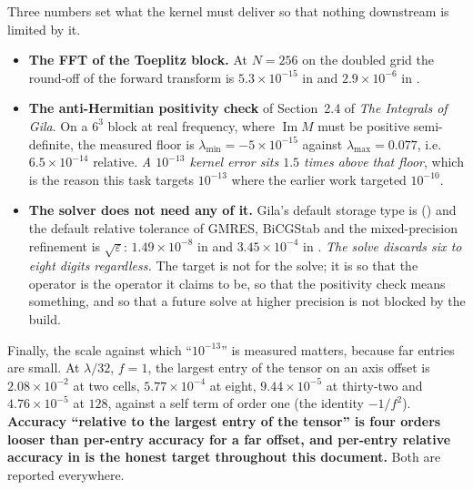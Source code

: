 Three numbers set what the kernel must deliver so that nothing downstream is limited by it.

\begin{itemize}[nosep,leftmargin=1.4em]
\item \textbf{The FFT of the Toeplitz block.} At $N = 256$ on the doubled grid the round-off
of the forward transform is $5.3\times10^{-15}$ in  and $2.9\times10^{-6}$ in
.
\item \textbf{The anti-Hermitian positivity check} of Section~2.4 of \emph{The Integrals of
Gila}. On a $6^3$ block at real frequency, where $\operatorname{Im}M$ must be positive
semi-definite, the measured floor is $\lambda_{\min} = -5\times10^{-15}$ against
$\lambda_{\max} = 0.077$, i.e.\ $6.5\times10^{-14}$ relative. \emph{A $10^{-13}$ kernel
error sits $1.5$ times above that floor}, which is the reason this task targets
$10^{-13}$ where the earlier work targeted $10^{-10}$.
\item \textbf{The solver does not need any of it.} Gila's default storage type is
 () and the default relative tolerance of GMRES, BiCGStab and
the mixed-precision refinement is $\sqrt{\varepsilon}$: $1.49\times10^{-8}$ in
 and $3.45\times10^{-4}$ in . \emph{The solve discards six to
eight digits regardless.} The target is not for the solve; it is so that the operator is
the operator it claims to be, so that the positivity check means something, and so that a
future solve at higher precision is not blocked by the build.
\end{itemize}

Finally, the scale against which ``$10^{-13}$'' is measured matters, because far entries are
small. At $\lambda/32$, $f = 1$, the largest entry of the tensor on an axis offset is
$2.08\times10^{-2}$ at two cells, $5.77\times10^{-4}$ at eight, $9.44\times10^{-5}$ at
thirty-two and $4.76\times10^{-5}$ at $128$, against a self term of order one (the identity
$-1/f^2$). \textbf{Accuracy ``relative to the largest entry of the tensor'' is four orders
looser than per-entry accuracy for a far offset, and per-entry relative accuracy in
 is the honest target throughout this document.} Both are reported everywhere.
